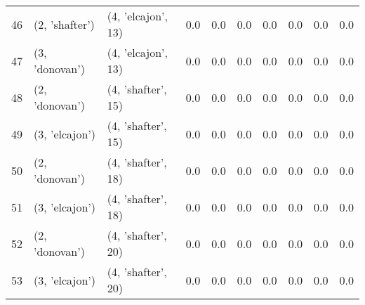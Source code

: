 \begin{tabular}{lllrrrrrrr}
46 &   (2, 'shafter') &  (4, 'elcajon', 13) &      0.0 &        0.0 &      0.0 &      0.0 &      0.0 &        0.0 &       0.0 \\
47 &   (3, 'donovan') &  (4, 'elcajon', 13) &      0.0 &        0.0 &      0.0 &      0.0 &      0.0 &        0.0 &       0.0 \\
48 &   (2, 'donovan') &  (4, 'shafter', 15) &      0.0 &        0.0 &      0.0 &      0.0 &      0.0 &        0.0 &       0.0 \\
49 &   (3, 'elcajon') &  (4, 'shafter', 15) &      0.0 &        0.0 &      0.0 &      0.0 &      0.0 &        0.0 &       0.0 \\
50 &   (2, 'donovan') &  (4, 'shafter', 18) &      0.0 &        0.0 &      0.0 &      0.0 &      0.0 &        0.0 &       0.0 \\
51 &   (3, 'elcajon') &  (4, 'shafter', 18) &      0.0 &        0.0 &      0.0 &      0.0 &      0.0 &        0.0 &       0.0 \\
52 &   (2, 'donovan') &  (4, 'shafter', 20) &      0.0 &        0.0 &      0.0 &      0.0 &      0.0 &        0.0 &       0.0 \\
53 &   (3, 'elcajon') &  (4, 'shafter', 20) &      0.0 &        0.0 &      0.0 &      0.0 &      0.0 &        0.0 &       0.0 \\
\bottomrule
\end{tabular}
